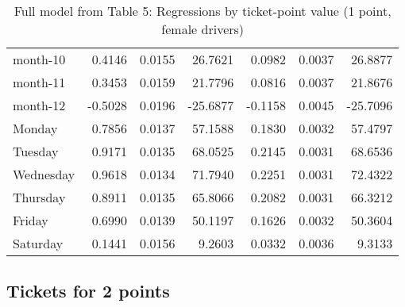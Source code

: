 \documentclass[10pt]{article}
\begin{document}
\begin{table}[ht]
\begin{tabular}{lrrrrrr}
  month-10 & 0.4146 & 0.0155 & 26.7621 & 0.0982 & 0.0037 & 26.8877 \\ 
  month-11 & 0.3453 & 0.0159 & 21.7796 & 0.0816 & 0.0037 & 21.8676 \\ 
  month-12 & -0.5028 & 0.0196 & -25.6877 & -0.1158 & 0.0045 & -25.7096 \\ 
  Monday & 0.7856 & 0.0137 & 57.1588 & 0.1830 & 0.0032 & 57.4797 \\ 
  Tuesday & 0.9171 & 0.0135 & 68.0525 & 0.2145 & 0.0031 & 68.6536 \\ 
  Wednesday & 0.9618 & 0.0134 & 71.7940 & 0.2251 & 0.0031 & 72.4322 \\ 
  Thursday & 0.8911 & 0.0135 & 65.8066 & 0.2082 & 0.0031 & 66.3212 \\ 
  Friday & 0.6990 & 0.0139 & 50.1197 & 0.1626 & 0.0032 & 50.3604 \\ 
  Saturday & 0.1441 & 0.0156 & 9.2603 & 0.0332 & 0.0036 & 9.3133 \\ 
   \hline
\end{tabular}
\caption{Full model from Table 5: Regressions by ticket-point value (1 point, female drivers)} 
\label{tab_5_1_pts_no_age_F}
\end{table}


\clearpage
\pagebreak




\subsection{Tickets for 2 points}



\end{document}
